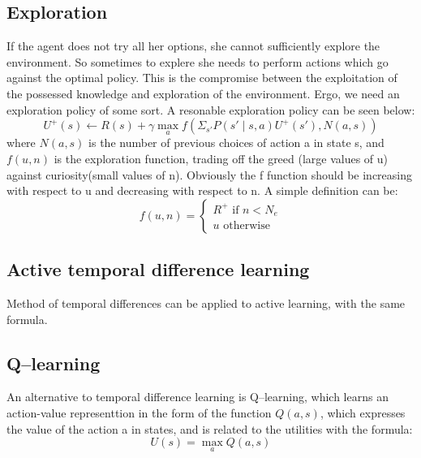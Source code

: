 \subsection{Exploration}
If the agent does not try all her options, she cannot sufficiently explore the environment. So sometimes to explere she needs to perform
actions which go against the optimal policy.
This is the compromise between the exploitation of the possessed knowledge and exploration of the environment.
Ergo, we need an exploration policy of some sort. A resonable exploration policy can be seen below:
\begin{equation}
    U^{+}(s) \leftarrow R(s) + \gamma \max_a f(\Sigma_{s'}P(s'\mid s,a)U^{+}(s'),N(a,s))
\end{equation}
where $N(a,s)$ is the number of previous choices of action a in state s, and  $f(u,n)$ is the exploration function,
trading off the greed (large values of u) against curiosity(small values of n).
Obviously the f function should be increasing with respect to u and decreasing with respect to n. A simple definition can be:
 \begin{equation}
     f(u,n) = \begin{cases}
         R^{+} \text{ if } n<N_e\\
         u \text{ otherwise}
     \end{cases}
\end{equation}

\subsection{Active temporal difference learning}
Method of temporal differences can be applied to active learning, with the same formula.
\subsection{Q--learning}
An alternative to temporal difference learning is Q--learning, which learns an action-value representtion in the form of the function
$Q(a,s)$, which expresses the value of the action a in states, and is related to the utilities with the formula:
\begin{equation}
    U(s) = \max_a Q(a,s)
\end{equation}
